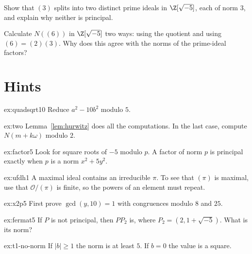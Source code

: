 \begin{exercise}[$\star\star$]\label{ex:v13-extra-02-3}
Show that $(3)$ splits into two distinct prime ideals in $\Z[\sqrt{-5}]$, each of norm $3$, and explain why neither is principal.
\end{exercise}

\begin{exercise}[$\star\star\star$]\label{ex:v13-extra-02-4}
Calculate $N((6))$ in $\Z[\sqrt{-5}]$ two ways: using the quotient and using $(6)=(2)(3)$. Why does this agree with the norms of the prime-ideal factors?
\end{exercise}

\section{Hints}

\begin{hint}{ex:quadsqrt10}
Reduce $a^2-10b^2$ modulo $5$.
\end{hint}

\begin{hint}{ex:two}
Lemma~\ref{lem:hurwitz} does all the computations. In the last case, compute $N(m+k\omega)$ modulo $2$.
\end{hint}

\begin{hint}{ex:factor5}
Look for square roots of $-5$ modulo $p$. A factor of norm $p$ is principal exactly when $p$ is a norm $x^2+5y^2$.
\end{hint}

\begin{hint}{ex:ufdh1}
A maximal ideal contains an irreducible $\pi$. To see that $(\pi)$ is maximal, use that $\mathcal O/(\pi)$ is finite, so the powers of an element must repeat.
\end{hint}

\begin{hint}{ex:x2p5}
First prove $\gcd(y,10)=1$ with congruences modulo $8$ and $25$.
\end{hint}

\begin{hint}{ex:fermat5}
If $P$ is not principal, then $PP_2$ is, where $P_2=(2,1+\sqrt{-5})$. What is its norm?
\end{hint}

\begin{hint}{ex:t1-no-norm}
If $|b|\ge 1$ the norm is at least $5$. If $b=0$ the value is a square.
\end{hint}

